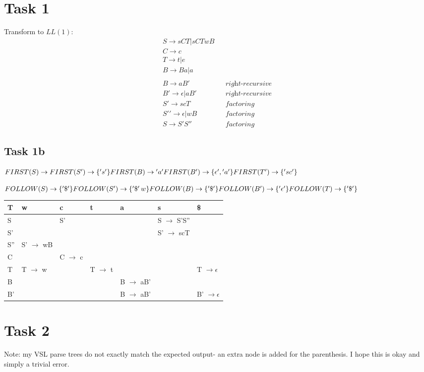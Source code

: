 \section*{Task 1}
Transform to $LL(1)$:
\begin{align*}
S \rightarrow sCT|sCTwB && \\
C \rightarrow c    && \\
T \rightarrow t|e  &&  \\
B \rightarrow Ba|a && \\
&& \\
B \rightarrow aB' && \textit{right-recursive} \\
B' \rightarrow \epsilon | aB' && \textit{right-recursive} \\
S' \rightarrow scT && \textit{factoring } \\
S{'}{'} \rightarrow \epsilon | wB && \textit{factoring} \\
S \rightarrow S'S'' && \textit{factoring} 
\end{align*}

\subsection*{Task 1b}
$
FIRST(S) \rightarrow  FIRST(S') \rightarrow  \{'s'\} \\
FIRST(B) \rightarrow  {'a'} \\
FIRST(B') \rightarrow  \{\epsilon{'}, {'}a{'}\} \\
FIRST(T') \rightarrow  \{{'}sc{'}\}
$
\newline

$
FOLLOW(S) \rightarrow \{'\$'\} \\
FOLLOW(S{'}) \rightarrow \{'\$'\, w\} \\
FOLLOW(B) \rightarrow \{'\$'\} \\
FOLLOW(B{'}) \rightarrow \{'\epsilon'\} \\
FOLLOW(T) \rightarrow \{'\$'\}
$

\begin{tabular}{|l|l|l|l|l|l|l|}
    T &w &c &t &a & s & \$ \\
    \bottomrule
    S &  & S' & & & S $\rightarrow$ S'S''  & \\
    \bottomrule
    S' & & & & & S' $\rightarrow$ scT & \\
    \bottomrule
    S'' &S' $\rightarrow$ wB  & & & &  & \\
    \bottomrule
    C & & C $\rightarrow$ c & & & & \\
    \bottomrule
    T & T $\rightarrow $ w & & T $\rightarrow$ t & & & T $\rightarrow \epsilon $ \\
    \bottomrule
    B & & & & B $\rightarrow$ aB'  &&  \\
    \bottomrule
    B' & & & & B $\rightarrow$ aB' & & B' $\rightarrow \epsilon $ \\
    \bottomrule
\end{tabular}



\section*{Task 2}
Note: my VSL parse trees do not exactly match the expected output- an extra node
is added for the parenthesis. I hope this is okay and simply a trivial error.
